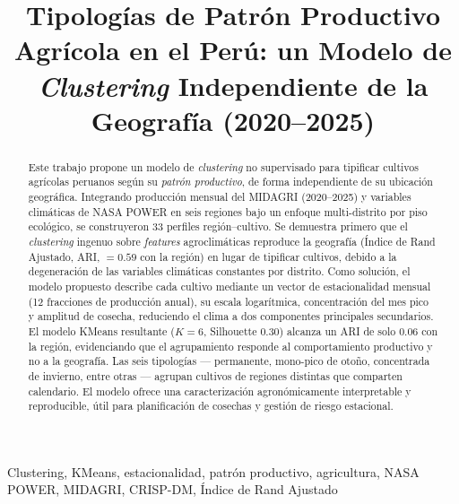 \documentclass[conference]{IEEEtran}
\begin{document}
\title{Tipologías de Patrón Productivo Agrícola en el Perú: un Modelo de \textit{Clustering} Independiente de la Geografía (2020--2025)}

\author{
}

\maketitle

\begin{abstract}
Este trabajo propone un modelo de \textit{clustering} no supervisado para tipificar cultivos agrícolas peruanos según su \emph{patrón productivo}, de forma independiente de su ubicación geográfica. Integrando producción mensual del MIDAGRI (2020--2025) y variables climáticas de NASA POWER en seis regiones bajo un enfoque multi-distrito por piso ecológico, se construyeron 33 perfiles región--cultivo. Se demuestra primero que el \textit{clustering} ingenuo sobre \textit{features} agroclimáticas reproduce la geografía (Índice de Rand Ajustado, ARI, $=0.59$ con la región) en lugar de tipificar cultivos, debido a la degeneración de las variables climáticas constantes por distrito. Como solución, el modelo propuesto describe cada cultivo mediante un vector de estacionalidad mensual (12 fracciones de producción anual), su escala logarítmica, concentración del mes pico y amplitud de cosecha, reduciendo el clima a dos componentes principales secundarios. El modelo KMeans resultante ($K=6$, Silhouette 0.30) alcanza un ARI de solo 0.06 con la región, evidenciando que el agrupamiento responde al comportamiento productivo y no a la geografía. Las seis tipologías --- permanente, mono-pico de otoño, concentrada de invierno, entre otras --- agrupan cultivos de regiones distintas que comparten calendario. El modelo ofrece una caracterización agronómicamente interpretable y reproducible, útil para planificación de cosechas y gestión de riesgo estacional.
\end{abstract}

\begin{IEEEkeywords}
Clustering, KMeans, estacionalidad, patrón productivo, agricultura, NASA POWER, MIDAGRI, CRISP-DM, Índice de Rand Ajustado
\end{IEEEkeywords}
\end{document}
